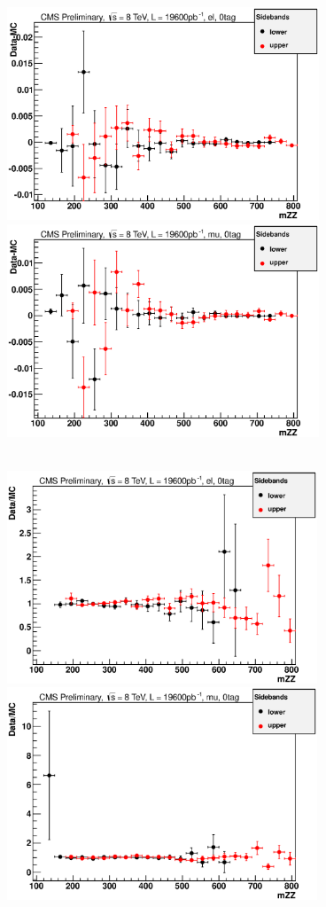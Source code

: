 \begin{figure}[htb!]
\centerline{
\includegraphics[height=2.5in]{Systematics/plots/subtract_el_2_0}
\includegraphics[height=2.5in]{Systematics/plots/subtract_mu_2_0}}
\centerline{
\\
\includegraphics[height=2.5in]{Systematics/plots/divide_el_2_0}
\includegraphics[height=2.5in]{Systematics/plots/divide_mu_2_0}
}
\end{figure}
